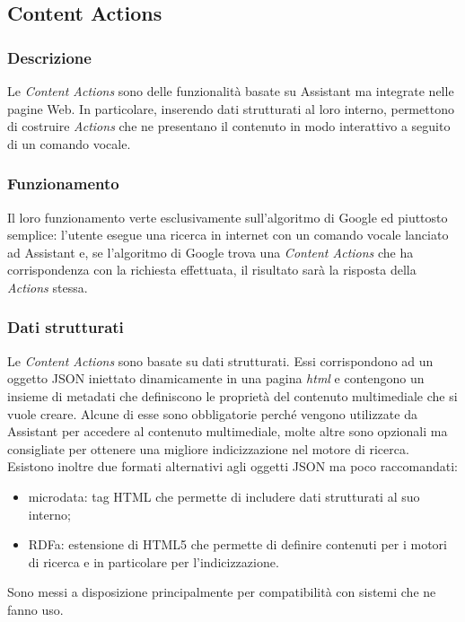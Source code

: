 	\subsection{Content Actions}
		\subsubsection{Descrizione}
		Le \emph{Content Actions} sono delle funzionalità basate su Assistant ma integrate nelle pagine Web. In particolare, inserendo dati strutturati al loro interno, permettono di costruire \emph{Actions} che ne presentano il contenuto in modo interattivo a seguito di un comando vocale.
		\subsubsection{Funzionamento}
		Il loro funzionamento verte esclusivamente sull'algoritmo di Google ed piuttosto semplice: l'utente esegue una ricerca in internet con un comando vocale lanciato ad Assistant e, se l'algoritmo di Google trova una \emph{Content Actions} che ha corrispondenza con la richiesta effettuata, il risultato sarà la risposta della \emph{Actions} stessa.
		\subsubsection{Dati strutturati}
		Le \emph{Content Actions} sono basate su dati strutturati. Essi corrispondono ad un oggetto JSON iniettato dinamicamente in una pagina \emph{\gls{html}} e contengono un insieme di metadati che definiscono le proprietà del contenuto multimediale che si vuole creare. Alcune di esse sono obbligatorie perché vengono utilizzate da Assistant per accedere al contenuto multimediale, molte altre sono opzionali ma consigliate per ottenere una migliore indicizzazione nel motore di ricerca. \\
		Esistono inoltre due formati alternativi agli oggetti JSON ma poco raccomandati:
		\begin{itemize}
			\item microdata: tag HTML che permette di includere dati strutturati al suo interno;
			\item RDFa: estensione di HTML5 che permette di definire contenuti per i motori di ricerca e in particolare per l'indicizzazione.
		\end{itemize}
		Sono messi a disposizione principalmente per compatibilità con sistemi che ne fanno uso.
